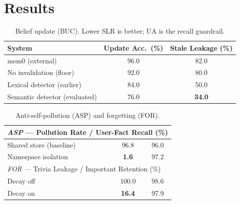 \documentclass[11pt]{article}
\newcommand{\bucSLRfull}{\textbf{34.0}}   %
\newcommand{\bucSLRvone}{50.0}            %
\newcommand{\bucSLRnone}{80.0}            %
\newcommand{\bucUAfull}{76.0}
\newcommand{\bucUAvone}{84.0}
\newcommand{\bucUAnone}{92.0}
\newcommand{\bucSLRmemo}{82.0}
\newcommand{\bucUAmemo}{96.0}
\newcommand{\aspPRiso}{\textbf{1.6}}      %
\newcommand{\aspPRshared}{96.8}           %
\newcommand{\aspUFRiso}{97.2}
\newcommand{\aspUFRshared}{96.0}
\newcommand{\forTLdecay}{\textbf{16.4}}
\newcommand{\forTLnone}{100.0}
\newcommand{\forIFRdecay}{97.9}
\newcommand{\forIFRnone}{98.6}
\begin{document}
\section{Results}
\label{sec:results}
\begin{table}[t]\centering
\caption{Belief update (BUC). Lower SLR is better; UA is the recall guardrail.}
\begin{tabular}{lcc}
\toprule
System & Update Acc.\ (\%) & Stale Leakage (\%) \\
\midrule
mem0 (external)\footnotemark{}      & \bucUAmemo{} & \bucSLRmemo{} \\
No invalidation (floor)        & \bucUAnone{} & \bucSLRnone{} \\
Lexical detector (earlier)     & \bucUAvone{} & \bucSLRvone{} \\
Semantic detector (evaluated)  & \bucUAfull{} & \bucSLRfull{} \\
\bottomrule
\end{tabular}
\end{table}

\begin{table}[t]\centering
\caption{Anti-self-pollution (ASP) and forgetting (FOR).}
\begin{tabular}{lcc}
\toprule
\multicolumn{3}{l}{\emph{ASP} --- Pollution Rate / User-Fact Recall (\%)}\\
\midrule
Shared store (baseline)  & \aspPRshared{} & \aspUFRshared{} \\
Namespace isolation      & \aspPRiso{}    & \aspUFRiso{} \\
\midrule
\multicolumn{3}{l}{\emph{FOR} --- Trivia Leakage / Important Retention (\%)}\\
\midrule
Decay off                & \forTLnone{}   & \forIFRnone{} \\
Decay on                 & \forTLdecay{}  & \forIFRdecay{} \\
\bottomrule
\end{tabular}
\end{table}
\end{document}
